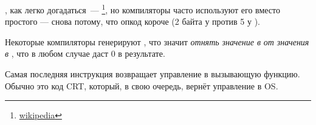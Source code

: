 \XOR, как легко догадаться~--- \footnote{\href{http://go.yurichev.com/17118}{wikipedia}}, но компиляторы часто используют его вместо простого
 --- снова потому, что опкод короче (2 байта у \XOR против 5 у \MOV).

Некоторые компиляторы генерируют , что значит \emph{отнять значение в} \EAX \emph{от значения в }\EAX, что в любом случае даст 0 в результате.

Самая последняя инструкция \RET возвращает управление в вызывающую функцию. Обычно это код \CCpp \ac{CRT}, который, в свою очередь, вернёт управление в \ac{OS}.

